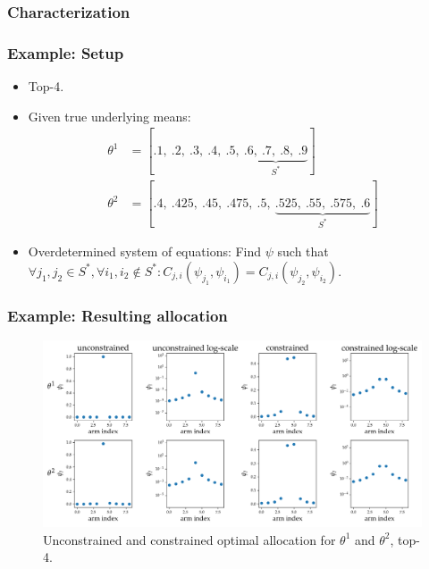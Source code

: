 \documentclass[aspectratio=43]{beamer}
\begin{document}
\begin{frame}
\frametitle{Characterization}
\end{frame}

\begin{frame}
\frametitle{Example: Setup}
\begin{itemize}[<+->]
  \item Top-4.
  \item Given true underlying means:
    \begin{align}
      \theta^1 &= [.1,\ .2,\ .3,\ .4,\ .5,\ \underbrace{.6,\ .7,\ .8,\
    .9}_\text{$S^*$}] \\
      \theta^2 &= [.4,\ .425,\ .45,\ .475,\ .5,\ \underbrace{.525,\ .55,\
    .575,\ .6}_\text{$S^*$}]
    \end{align}
  \item Overdetermined system of equations: Find $\psi$ such that $\forall j_1,
    j_2 \in S^*, \forall i_1, i_2 \notin S^*: C_{j, i}(\psi_{j_1}, \psi_{i_1})
    = C_{j, i}(\psi_{j_2}, \psi_{i_2})$.
\end{itemize}
\end{frame}

\begin{frame}
\frametitle{Example: Resulting allocation}
\begin{figure}[h]
  \centering
  \includegraphics[width=\textwidth]{optimal_allocation.png}
  \caption{Unconstrained and constrained optimal allocation for $\theta^1$ and $\theta^2$, top-4.}
  \label{fig:optimal_allocation}
\end{figure}
\end{frame}
\end{document}
